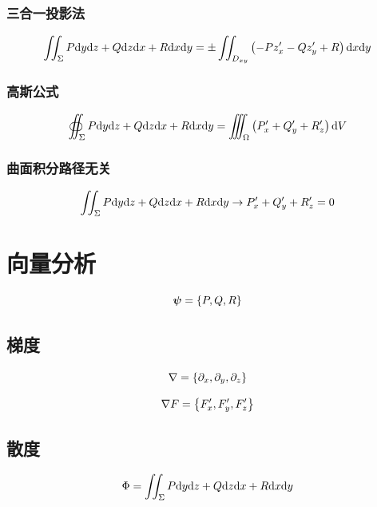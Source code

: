 \documentclass{article}
\begin{document}
\subsubsection{三合一投影法}

\[\iint_\Sigma P\mathrm d y\mathrm d z+Q\mathrm d z\mathrm d x+R\mathrm d x\mathrm d y=
    \pm\iint_{D_{xy}}
    \left(-Pz_x^\prime-Qz_y^\prime+R\right)
    \mathrm d x\mathrm d y\]

\subsubsection{高斯公式}

\[\oiint_\Sigma P\mathrm d y\mathrm d z+Q\mathrm d z\mathrm d x+R\mathrm d x\mathrm d y=
    \iiint_\Omega\left(P_x^\prime+Q_y^\prime+R_z^\prime\right)\mathrm d V\]

\subsubsection{曲面积分路径无关}

\[\iint_\Sigma P\mathrm d y\mathrm d z+Q\mathrm d z\mathrm d x+R\mathrm d x\mathrm d y
    \to P_x^\prime+Q_y^\prime+R_z^\prime=0\]

\section{向量分析}

\begin{definition}[向量场]
    \[\boldsymbol\psi=\left\{P,Q,R\right\}\]
\end{definition}

\subsection{梯度}

\begin{definition}[向量微分算子]
    \[\nabla=\left\{\partial_x,\partial_y,\partial_z\right\}\]
\end{definition}

\begin{theorem}[梯度]
    \[\nabla F=\left\{F_x^\prime,F_y^\prime,F_z^\prime\right\}\]
\end{theorem}

\subsection{散度}

\begin{definition}
    \[\Phi=\iint_\Sigma P\mathrm d y\mathrm d z+Q\mathrm d z\mathrm d x+R\mathrm d x\mathrm d y\]
\end{definition}
\end{document}
